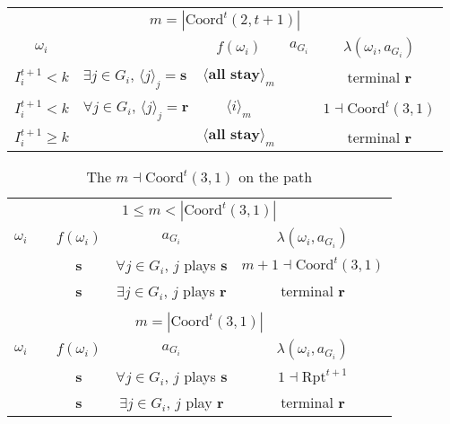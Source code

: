 \documentclass[12pt,letter]{article}
\newcommand{\Kappa}{\mathrm{Coord}}
\newcommand{\Omicron}{\mathrm{Rpt}}
\theoremstyle{definition}
\theoremstyle{remark}
\theoremstyle{claim}
\begin{document}
\begin{table}[!htbp]
\begin{center}
\begin{tabular}{c l | c | c | c}
\multicolumn{5}{c}{$m= |\Kappa^t(2,t+1)|$}\\
$\omega_i$ 	 & 	   &	$f(\omega_i)$  &	$a_{G_i}$ & $\lambda(\omega_i,a_{G_i})$ \\
\hline
\hline
$I^{t+1}_i< k$  	& 	$\exists j\in G_i$, $\langle j \rangle_j=\textbf{s}$	& $\langle \textbf{all stay} \rangle_m$		&  	& terminal \textbf{r}\\
$I^{t+1}_i< k$  	& 	$\forall j\in G_i$, $\langle j \rangle_j=\textbf{r}$	& $\langle i \rangle_m$		&  	& $1\dashv \Kappa^t(3,1)$\\
$I^{t+1}_i\geq k$	 & 				& $\langle \textbf{all stay} \rangle_m$ 	& 		& terminal \textbf{r}\\
\hline
\end{tabular}
\end{center}
\end{table}




\clearpage









\begin{table}[!htbp]
\caption{The $m\dashv\Kappa^t(3,1)$ on the path}
\label{table:eqm_path_kt3}
\begin{center}
\begin{tabular}{c c | c | c | c}
\multicolumn{5}{c}{$1\leq m < |\Kappa^t(3,1)|$}\\
$\omega_i$ 	 & 	   &	$f(\omega_i)$  &	$a_{G_i}$ & $\lambda(\omega_i,a_{G_i})$ \\
\hline
\hline
  	&	& \textbf{s} & $\forall j\in G_i$, $j$ plays $\textbf{s}$ 	& $m+1\dashv \Kappa^t(3,1)$\\
  	&  & \textbf{s}  &  $\exists j\in G_i$, $j$ plays $\textbf{r}$  	& terminal \textbf{r}\\
\hline
\\
\multicolumn{5}{c}{$m= |\Kappa^t(3,1)|$}\\
$\omega_i$ 	 & 	   &	$f(\omega_i)$  &	$a_{G_i}$ & $\lambda(\omega_i,a_{G_i})$ \\
\hline
\hline
 	& 	& \textbf{s} & $\forall j\in G_i$, $j$ plays $\textbf{s}$ 	& $1\dashv \Omicron^{t+1}$\\
  	&  & \textbf{s}  &  $\exists j\in G_i$, $j$ play $\textbf{r}$  	& terminal \textbf{r}\\
\hline
\end{tabular}
\end{center}
\end{table}
\end{document}
